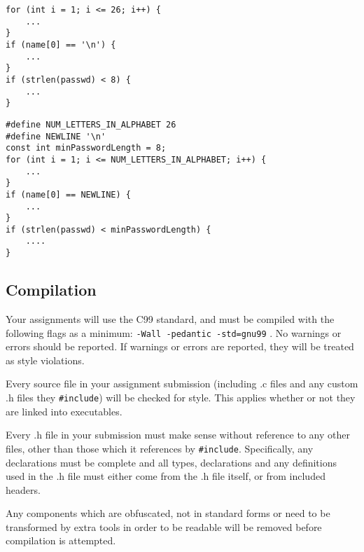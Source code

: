 \documentclass{article}
\begin{document}
\begin{minipage}{0.32\linewidth}
\begin{lstlisting}
for (int i = 1; i <= 26; i++) {
    ...
}
if (name[0] == '\n') {
    ...
}
if (strlen(passwd) < 8) {
    ...
}
\end{lstlisting}
\end{minipage}
\begin{minipage}{0.05\linewidth}
\hspace{0.2cm}
\end{minipage}
\begin{minipage}{0.55\linewidth}

\begin{lstlisting}
#define NUM_LETTERS_IN_ALPHABET 26
#define NEWLINE '\n'
const int minPasswordLength = 8;
for (int i = 1; i <= NUM_LETTERS_IN_ALPHABET; i++) {
    ...
}
if (name[0] == NEWLINE) {
    ...
}
if (strlen(passwd) < minPasswordLength) {
    ....
}
\end{lstlisting}
\end{minipage}


\subsection{Compilation}
Your assignments will use the C99 standard, and must be compiled with the following flags as a minimum: \texttt{-Wall -pedantic -std=gnu99} .
No warnings or errors should be reported.
If warnings or errors are reported, they will be treated as style violations.

Every source file in your assignment submission (including .c files and any custom .h files they \texttt{\#include}) will be checked for style.
This applies whether or not they are linked into executables.

Every .h file in your submission must make sense without reference to any other files, other than those which it references by \texttt{\#include}.
Specifically, any declarations must be complete and all types, declarations and any definitions used in the .h file must either come from the .h file itself, or from included headers.

Any components which are obfuscated, not in standard forms or need to be transformed by extra tools in order to be readable will be removed before compilation is attempted.
\end{document}
